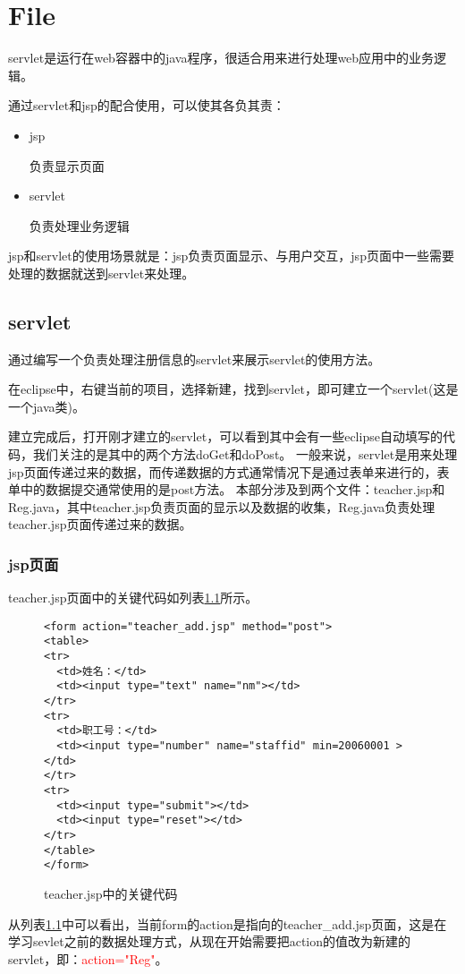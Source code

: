 \chapter{File}
servlet是运行在web容器中的java程序，很适合用来进行处理web应用中的业务逻辑。

通过servlet和jsp的配合使用，可以使其各负其责：
\begin{itemize}
\item jsp

负责显示页面
\item servlet

负责处理业务逻辑
\end{itemize}
jsp和servlet的使用场景就是：jsp负责页面显示、与用户交互，jsp页面中一些需要处理的数据就送到servlet来处理。
\section{servlet}
通过编写一个负责处理注册信息的servlet来展示servlet的使用方法。

在eclipse中，右键当前的项目，选择新建，找到servlet，即可建立一个servlet(这是一个java类)。

建立完成后，打开刚才建立的servlet，可以看到其中会有一些eclipse自动填写的代码，我们关注的是其中的两个方法doGet和doPost。
一般来说，servlet是用来处理jsp页面传递过来的数据，而传递数据的方式通常情况下是通过表单来进行的，表单中的数据提交通常使用的是post方法。
本部分涉及到两个文件：teacher.jsp和Reg.java，其中teacher.jsp负责页面的显示以及数据的收集，Reg.java负责处理teacher.jsp页面传递过来的数据。
\subsection{jsp页面}
teacher.jsp页面中的关键代码如列表\ref{teacherjsp}所示。
\begin{figure}
\begin{lstlisting}
<form action="teacher_add.jsp" method="post">
<table>
<tr>
  <td>姓名：</td>
  <td><input type="text" name="nm"></td>
</tr>
<tr>
  <td>职工号：</td>
  <td><input type="number" name="staffid" min=20060001 ></td>
</tr>
<tr>
  <td><input type="submit"></td>
  <td><input type="reset"></td>
</tr>
</table>
</form>
\end{lstlisting}
\caption{teacher.jsp中的关键代码}
\label{teacherjsp}
\end{figure}
从列表\ref{teacherjsp}中可以看出，当前form的action是指向的teacher\_add.jsp页面，这是在学习sevlet之前的数据处理方式，从现在开始需要把action的值改为新建的servlet，即：\textcolor{red}{action="Reg"}。
